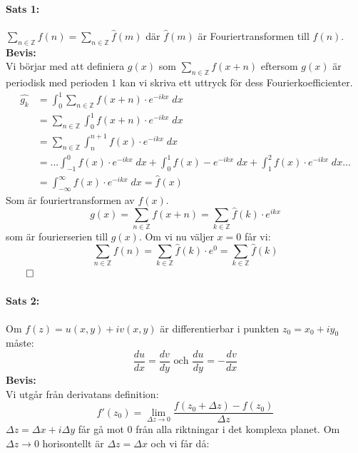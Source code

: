\paragraph{Sats 1:} 
$\sum\limits_{n \in \mathbb{Z}} f(n) = \sum\limits_{n \in \mathbb{Z}} \hat{f}(m)$ där $\hat{f}(m)$ är Fouriertransformen till $f(n)$.
\\
{\bf Bevis:} \\
Vi börjar med att definiera $g(x)$ som $\sum\limits_{n \in \mathbb{Z}} f(x + n)$ eftersom $g(x)$ är periodisk med perioden $1$
kan vi skriva ett uttryck för dess Fourierkoefficienter.
\begin{align*}
	\hat{g_k} &= \int_0^1 \sum_{n \in \mathbb{Z}} f(x + n) \cdot e^{-ikx}\; dx \\
			  &= \sum_{n \in \mathbb{Z}} \int_0^1 f(x + n) \cdot e^{-ikx}\; dx \\
			  &= \sum_{n \in \mathbb{Z}} \int_n^{n + 1} f(x) \cdot e^{-ikx}\; dx \\
			  &= ... \int_{-1}^0 f(x) \cdot e^{-ikx}\; dx + \int_0^1 f(x) - e^{-ikx}\; dx + \int_1^2 f(x) \cdot e^{-ikx}\; dx ... \\
			  &= \int_{- \infty}^\infty f(x) \cdot e^{-ikx}\; dx = \hat{f}(x)
\end{align*}
Som är fouriertransformen av $f(x)$.
\[
	g(x) = \sum_{n \in \mathbb{Z}} f(x + n) = \sum_{k \in \mathbb{Z}} \hat{f}(k) \cdot e^{ikx}%
\]
som är fourierserien till $g(x)$. Om vi nu väljer $x = 0$ får vi:
\[
	\sum_{n \in \mathbb{Z}} f(n) = \sum_{k \in \mathbb{Z}} \hat{f}(k) \cdot e^0 = \sum_{k \in \mathbb{Z}} \hat{f}(k)
\]
$\hfill \qed$

\paragraph{Sats 2:}
Om $f(z) = u(x, y) + iv(x, y)$ är differentierbar i punkten $z_0 = x_0 + iy_0$ måste:
\newcommand{\du}[2] {
	\frac {d #1} {d #2} 
}
\[
	\du u x = \du v y \text{ och }
	\du u y = -\du v x
\]
{\bf Bevis:}
\\
Vi utgår från derivatans definition:
$$f'(z_0) = \lim_{\Delta z \to 0} \frac {f(z_0 + \Delta z) - f(z_0)} {\Delta z} $$
$\Delta z = \Delta x + i \Delta y$ får gå mot $0$ från alla riktningar i det komplexa planet.
Om $\Delta z \to 0$ horisontellt är $\Delta z = \Delta x$ och vi får då:
\newcommand{\xtz} {
	\Delta x \to 0
}
\newcommand{\bracketDelta}[4] {
	\lim_{\Delta #1 \to 0} \left [
		\frac {
			#2(x_0, #3) - #2(x_0, y_0)
		} {
			#4
		}
	\right ]
}


